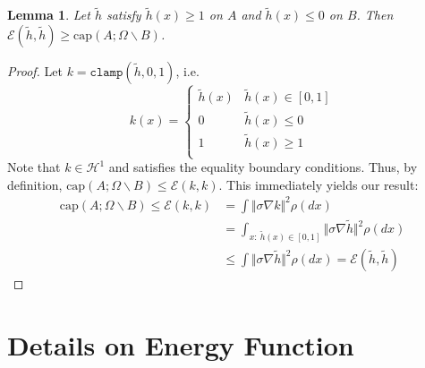\documentclass[english, aip, jcp, priprint, graphicx,floatfix]{revtex4-1}
\newtheorem{lemma}{Lemma}
\theoremstyle{plain}
\theoremstyle{definition}
\theoremstyle{plain}
\newcommand{\capac}[2]{\mathrm{cap}\left(#1;#2\right)}
\begin{document}
\begin{lemma} \label{lem:inequalityboundaryvar} Let $\tilde h$ satisfy $\tilde h(x)\geq 1$ on $A$ and $\tilde h(x)\leq 0$ on $B$.  Then $\mathscr{E}(\tilde h,\tilde h) \geq \capac{A}{\Omega \backslash B}$.
\end{lemma}
\begin{proof}
Let $k=\mathtt{clamp}(\tilde h,0,1)$, i.e.
\[
k(x)=
\begin{cases}
\tilde h(x) & \tilde h(x)\in[0,1] \\
0 & \tilde h(x)\leq 0 \\
1 & \tilde h(x)\geq 1 \\
\end{cases}
\]  
Note that $k\in \mathcal{H}^1$ and satisfies the equality boundary conditions.  Thus, by definition, $\capac{A}{\Omega \backslash B} \leq \mathscr{E}(k,k)$.  This immediately yields our result:
\begin{align*}
\capac{A}{\Omega \backslash B} \leq \mathscr{E}(k,k) &= \int \Vert \sigma \nabla k \Vert^2 \rho(dx) \\
    &=\int_{x:\ \tilde h(x)\in[0,1]} \Vert \sigma \nabla \tilde h \Vert^2 \rho(dx) \\
    &\leq \int \Vert \sigma \nabla \tilde h \Vert^2 \rho(dx) = \mathscr{E}(\tilde h,\tilde h)
\end{align*}


\end{proof}

\section{Details on Energy Function} \label{sec:energy_function}
\end{document}
